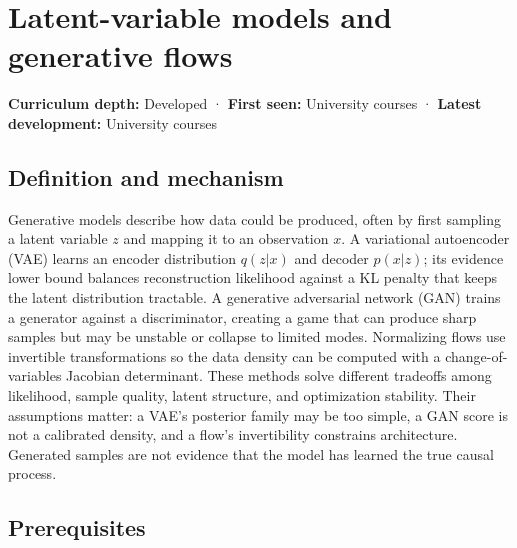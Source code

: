\hypertarget{appendix-2c568f05ee34}{}\label{referencestart:appendix-2c568f05ee34}
\section{Latent-variable models and generative flows}\label{appendix-2c568f05ee34-latent-variable-models-and-generative-flows}

\hypertarget{appendix-2c568f05ee34-latent-variable-models-and-generative-flows}{}

\textbf{Curriculum depth:} Developed · \textbf{First seen:} University courses · \textbf{Latest development:} University courses

\begin{allmightroledefinition}

\subsection{Definition and mechanism}\label{appendix-2c568f05ee34-definition-and-mechanism}

\hypertarget{appendix-2c568f05ee34-definition-and-mechanism}{}

Generative models describe how data could be produced, often by first sampling a latent variable \(z\) and mapping it to an observation \(x\). A variational autoencoder (VAE) learns an encoder distribution \(q(z|x)\) and decoder \(p(x|z)\); its evidence lower bound balances reconstruction likelihood against a KL penalty that keeps the latent distribution tractable. A generative adversarial network (GAN) trains a generator against a discriminator, creating a game that can produce sharp samples but may be unstable or collapse to limited modes. Normalizing flows use invertible transformations so the data density can be computed with a change-of-variables Jacobian determinant. These methods solve different tradeoffs among likelihood, sample quality, latent structure, and optimization stability. Their assumptions matter: a VAE's posterior family may be too simple, a GAN score is not a calibrated density, and a flow's invertibility constrains architecture. Generated samples are not evidence that the model has learned the true causal process.

\end{allmightroledefinition}

\subsection{Prerequisites}\label{appendix-2c568f05ee34-prerequisites}


